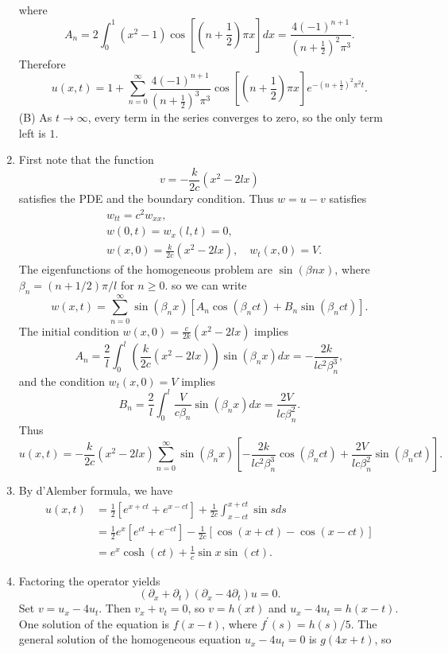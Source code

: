 \documentclass[11pt,a4paper]{article}
\begin{document}
\begin{enumerate}
$$		$$
		where
		$$
		A_n = 2\int_0^1 (x^2 - 1)\cos\left[\left(n + \frac{1}{2}\right)\pi x\right]dx = \frac{4(-1)^{n + 1}}{\left(n + \frac{1}{2}\right)^2\pi^3}.
		$$
		Therefore
		$$
		u(x, t) = 1 + \sum_{n = 0}^\infty \frac{4(-1)^{n + 1}}{\left(n + \frac{1}{2}\right)^3\pi^3}\cos\left[\left(n + \frac{1}{2}\right)\pi x\right]e^{-\left(n + \frac{1}{2}\right)^2\pi^2 t}.
		$$
		(B) As $t \to \infty$, every term in the series converges to zero, so the only term left is $1$.
		\item First note that the function
		$$
		v = -\frac{k}{2c}(x^2 - 2lx)
		$$
		satisfies the PDE and the boundary condition. Thus $w = u - v$ satisfies
		\begin{align*}
			& w_{tt} = c^2w_{xx},\\
			& w(0, t) = w_x(l, t) = 0,\\
			& w(x, 0) = \frac{k}{2c}(x^2 - 2lx),\quad w_t(x, 0) = V.
		\end{align*}
		The eigenfunctions of the homogeneous problem are $\sin(\beta nx)$, where $\beta_n = (n+1/2)\pi /l$ for $n \geq 0$. so we can write
		$$
		w(x, t) = \sum_{n = 0}^\infty \sin(\beta_n x)[A_n\cos(\beta_n ct) + B_n\sin (\beta_n ct)].
		$$
		The initial condition $w(x, 0) = \frac{c}{2k}(x^2 - 2lx)$ implies
		$$
		A_n = \frac{2}{l}\int_0^l\left(\frac{k}{2c}(x^2 - 2lx)\right)\sin(\beta_nx)dx = -\frac{2k}{lc^2\beta_n^3},
		$$
		and the condition $w_t(x, 0) = V$ implies
		$$
		B_n = \frac{2}{l}\int_0^l \frac{V}{c\beta_n}\sin(\beta_nx)dx = \frac{2V}{lc\beta_n^2}.
		$$
		Thus
		$$
		u(x, t) = -\frac{k}{2c}(x^2 - 2lx)\sum_{n = 0}^\infty\sin(\beta_nx)\left[-\frac{2k}{lc^2\beta_n^3}\cos(\beta_nct) + \frac{2V}{lc\beta_n^2}\sin(\beta_nct)\right].
		$$
		\item By d'Alember formula, we have
		\begin{align*}
			u(x, t)
			&= \frac{1}{2}[e^{x + ct} + e^{x - ct}] + \frac{1}{2c}\int_{x-ct}^{x + ct}\sin sds\\
			&= \frac{1}{2}e^x[e^{ct} + e^{-ct}] - \frac{1}{2c}[\cos(x + ct) - \cos(x-ct)]\\
			&= e^x\cosh(ct) + \frac{1}{c}\sin x\sin(ct).
		\end{align*}
		\item Factoring the operator yields
		$$
		(\partial_x + \partial_t)(\partial_x - 4\partial_t)u = 0.
		$$
		Set $v = u_x - 4u_t$. Then $v_x + v_t = 0$, so $v = h(x  t)$ and $u_x - 4u_t = h(x − t)$. One solution of the equation is $f(x − t)$, where $f^\prime(s) = h(s)/5$. The general solution of the homogeneous equation $u_x - 4u_t = 0$ is $g(4x + t)$, so

\end{enumerate}
\end{document}
